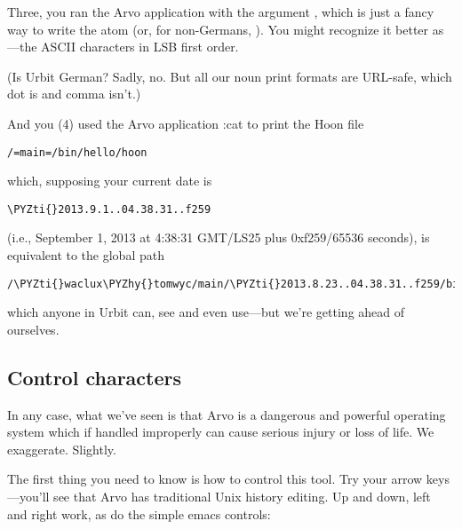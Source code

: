Three, you ran the Arvo application  with the argument
, which is just a fancy way to write the atom
 (or, for non-Germans, ).  You
might recognize it better as ---the ASCII
characters in LSB first order.

(Is Urbit German?  Sadly, no.  But all our noun print formats are
URL-safe, which dot is and comma isn't.)

And you (4) used the Arvo application :cat to print the Hoon file

\begin{framed_shaded}
\begin{Verbatim}[fontsize=\relsize{-2.5},fontseries=b,commandchars=\\\{\}]
/=main=/bin/hello/hoon
\end{Verbatim}
\end{framed_shaded}
which, supposing your current date is

\begin{framed_shaded}
\begin{Verbatim}[fontsize=\relsize{-2.5},fontseries=b,commandchars=\\\{\}]
\PYZti{}2013.9.1..04.38.31..f259
\end{Verbatim}
\end{framed_shaded}
(i.e., September 1, 2013 at 4:38:31 GMT/LS25 plus 0xf259/65536
seconds), is equivalent to the global path

\begin{framed_shaded}
\begin{Verbatim}[fontsize=\relsize{-2.5},fontseries=b,commandchars=\\\{\}]
/\PYZti{}waclux\PYZhy{}tomwyc/main/\PYZti{}2013.8.23..04.38.31..f259/bin/hello/hoon
\end{Verbatim}
\end{framed_shaded}
which anyone in Urbit can, see and even use---but we're getting
ahead of ourselves.

\subsection{Control characters}

In any case, what we've seen is that Arvo is a dangerous and
powerful operating system which if handled improperly can cause
serious injury or loss of life.  We exaggerate.  Slightly.

The first thing you need to know is how to control this tool.
Try your arrow keys---you'll see that Arvo has traditional Unix
history editing.  Up and down, left and right work, as do the
simple emacs controls:

